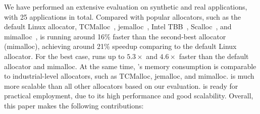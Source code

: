 


We have performed an extensive evaluation on synthetic and real applications, with 25 applications in total. Compared \NM{} with popular allocators, such as the default Linux allocator, TCMalloc~\cite{tcmalloc}, jemalloc~\cite{jemalloc}, Intel TBB~\cite{tbb}, Scalloc~\cite{Scalloc}, and mimalloc~\cite{mimalloc},  \NM{} is running around 16\% faster than the second-best allocator (mimalloc), achieving around 21\% speedup comparing to the default Linux allocator. For the best case, \NM{} runs up to $5.3\times$ and $4.6\times$ faster than the default allocator and mimalloc. At the same time, \NM{}'s memory consumption is comparable to industrial-level allocators, such as TCMalloc, jemalloc, and mimalloc. \NM{} is much more scalable than all other allocators based on our evaluation. \NM{} is ready for practical employment, due to its high performance and good scalability. 
Overall, this paper makes the following contributions:


